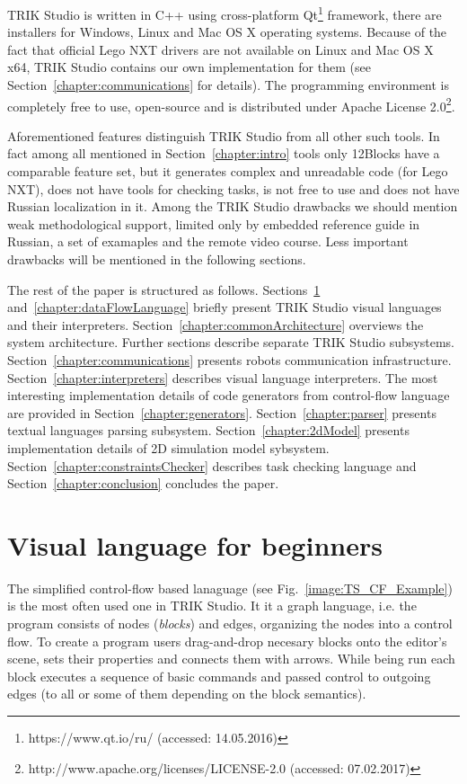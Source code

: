 \documentclass[conference]{IEEEtran}
\begin{document}
TRIK Studio is written in C++ using cross-platform Qt\footnote{https://www.qt.io/ru/ (accessed: 14.05.2016)} framework, there are installers for Windows, Linux and Mac OS X operating systems. Because of the fact that official Lego NXT drivers are not available on Linux and Mac OS X x64, TRIK Studio contains our own implementation for them (see Section~\ref{chapter:communications} for details). The programming environment is completely free to use, open-source and is distributed under Apache License 2.0\footnote{http://www.apache.org/licenses/LICENSE-2.0 (accessed: 07.02.2017)}.

Aforementioned features distinguish TRIK Studio from all other such tools. In fact among all mentioned in Section~\ref{chapter:intro} tools only 12Blocks have a comparable feature set, but it generates complex and unreadable code (for Lego NXT), does not have tools for checking tasks, is not free to use and does not have Russian localization in it. Among the TRIK Studio drawbacks we should mention weak methodological support, limited only by embedded reference guide in Russian, a set of examaples and the remote video course. Less important drawbacks will be mentioned in the following sections. 

The rest of the paper is structured as follows. Sections~\ref{chapter:controlFlowLanguage} and~\ref{chapter:dataFlowLanguage} briefly present TRIK Studio visual languages and their interpreters. Section~\ref{chapter:commonArchitecture} overviews the system architecture. Further sections describe separate TRIK Studio subsystems. Section~\ref{chapter:communications} presents robots communication infrastructure. Section~\ref{chapter:interpreters} describes visual language interpreters. The most interesting implementation details of code generators from control-flow language are provided in Section~\ref{chapter:generators}. Section~\ref{chapter:parser} presents textual languages parsing subsystem. Section~\ref{chapter:2dModel} presents implementation details of 2D simulation model sybsystem. Section~\ref{chapter:constraintsChecker} describes task checking language and Section~\ref{chapter:conclusion} concludes the paper.

\section{Visual language for beginners}
\label{chapter:controlFlowLanguage}

The simplified control-flow based lanaguage (see Fig.~\ref{image:TS_CF_Example}) is the most often used one in TRIK Studio. It it a graph language, i.e. the program consists of nodes (\textit{blocks}) and edges, organizing the nodes into a control flow. To create a program users drag-and-drop necesary blocks onto the editor's scene, sets their properties and connects them with arrows. While being run each block executes a sequence of basic commands and passed control to outgoing edges (to all or some of them depending on the block semantics). 
\end{document}

